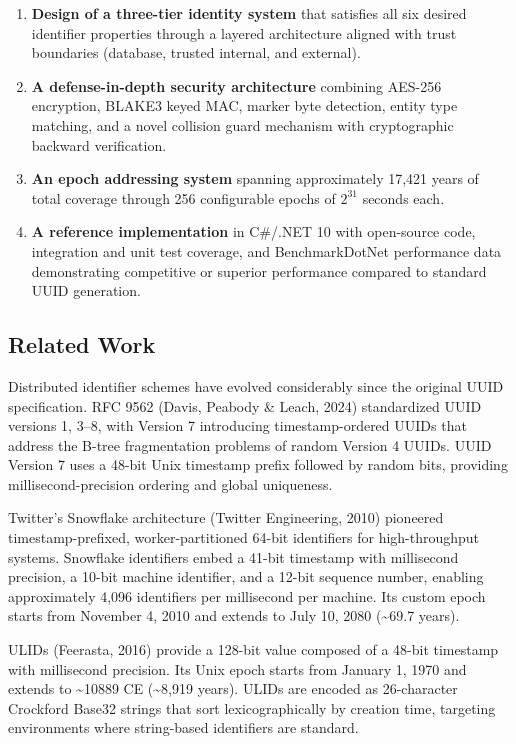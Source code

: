 \documentclass[fleqn,10pt,lineno]{wlpeerj}
\providecommand{\tightlist}{%
  \setlength{\itemsep}{0pt}\setlength{\parskip}{0pt}}
\begin{document}
\begin{enumerate}
\def\labelenumi{\arabic{enumi}.}
\tightlist
\item
  \textbf{Design of a three-tier identity system} that satisfies all six
  desired identifier properties through a layered architecture aligned
  with trust boundaries (database, trusted internal, and external).
\item
  \textbf{A defense-in-depth security architecture} combining AES-256
  encryption, BLAKE3 keyed MAC, marker byte detection, entity type
  matching, and a novel collision guard mechanism with cryptographic
  backward verification.
\item
  \textbf{An epoch addressing system} spanning approximately 17,421
  years of total coverage through 256 configurable epochs of \(2^{31}\)
  seconds each.
\item
  \textbf{A reference implementation} in C\#/.NET 10 with open-source
  code, integration and unit test coverage, and BenchmarkDotNet
  performance data demonstrating competitive or superior performance
  compared to standard UUID generation.
\end{enumerate}

\newpage

\subsection{Related Work}\label{related-work}

Distributed identifier schemes have evolved considerably since the
original UUID specification. RFC 9562 (Davis, Peabody \& Leach, 2024)
standardized UUID versions 1, 3--8, with Version 7 introducing
timestamp-ordered UUIDs that address the B-tree fragmentation problems
of random Version 4 UUIDs. UUID Version 7 uses a 48-bit Unix timestamp
prefix followed by random bits, providing millisecond-precision ordering
and global uniqueness.

Twitter's Snowflake architecture (Twitter Engineering, 2010) pioneered
timestamp-prefixed, worker-partitioned 64-bit identifiers for
high-throughput systems. Snowflake identifiers embed a 41-bit timestamp
with millisecond precision, a 10-bit machine identifier, and a 12-bit
sequence number, enabling approximately 4,096 identifiers per
millisecond per machine. Its custom epoch starts from November 4, 2010
and extends to July 10, 2080 (\textasciitilde69.7 years).

ULIDs (Feerasta, 2016) provide a 128-bit value composed of a 48-bit
timestamp with millisecond precision. Its Unix epoch starts from January
1, 1970 and extends to \textasciitilde10889 CE (\textasciitilde8,919
years). ULIDs are encoded as 26-character Crockford Base32 strings that
sort lexicographically by creation time, targeting environments where
string-based identifiers are standard.
\end{document}
